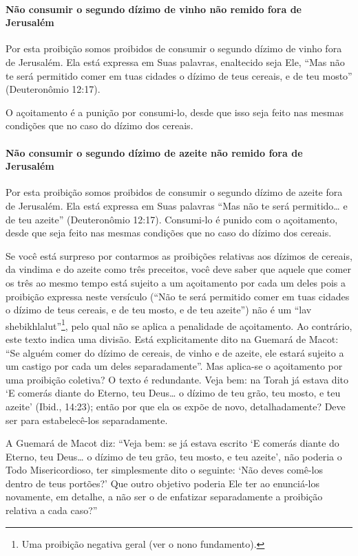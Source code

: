 \paragraph{Não consumir o segundo dízimo de vinho não remido fora de Jerusalém}

Por esta proibição somos proibidos de consumir o segundo dízimo de vinho
fora de Jerusalém. Ela está expressa em Suas palavras, enaltecido seja
Ele, ``Mas não te será permitido comer em tuas cidades o dízimo de teus
cereais, e de teu mosto'' (Deuteronômio 12:17).

O açoitamento é a punição por consumi-lo, desde que isso seja feito nas
mesmas condições que no caso do dízimo dos cereais.

\paragraph{Não consumir o segundo dízimo de azeite não remido fora de Jerusalém}

Por esta proibição somos proibidos de consumir o segundo dízimo de
azeite fora de Jerusalém. Ela está expressa em Suas palavras ``Mas não
te será permitido\ldots{} e de teu azeite'' (Deuteronômio 12:17). Consumi-lo
é punido com o açoitamento, desde que seja feito nas mesmas condições
que no caso do dízimo dos cereais.

Se você está surpreso por contarmos as proibições relativas aos dízimos
de cereais, da vindima e do azeite como três preceitos, você deve saber
que aquele que comer os três ao mesmo tempo está sujeito a um
açoitamento por cada um deles pois a proibição expressa neste versículo
(``Não te será permitido comer em tuas cidades o dízimo de teus
cereais, e de teu mosto, e de teu azeite'') não é um ``lav
shebikhlalut''\footnote{Uma proibição negativa geral (ver o nono fundamento).}, pelo qual não se aplica a
penalidade de açoitamento. Ao contrário, este texto indica uma divisão.
Está explicitamente dito na Guemará de Macot: ``Se alguém comer do
dízimo de cereais, de vinho e de azeite, ele estará sujeito a um castigo
por cada um deles separadamente''. Mas aplica-se o açoitamento por uma
proibição coletiva? O texto é redundante. Veja bem: na Torah já estava
dito `E comerás diante do Eterno, teu Deus\ldots{} o dízimo de teu grão, teu
mosto, e teu azeite' (Ibid., 14:23); então por que ela os expõe de novo,
detalhadamente? Deve ser para estabelecê-los separadamente.

A Guemará de Macot diz: ``Veja bem: se já estava escrito `E comerás
diante do Eterno, teu Deus\ldots{} o dízimo de teu grão, teu mosto, e teu
azeite', não poderia o Todo Misericordioso, ter simplesmente dito o
seguinte: `Não deves comê-los dentro de teus portões?' Que outro
objetivo poderia Ele ter ao enunciá-los novamente, em detalhe, a não ser
o de enfatizar separadamente a proibição relativa a cada caso?''

